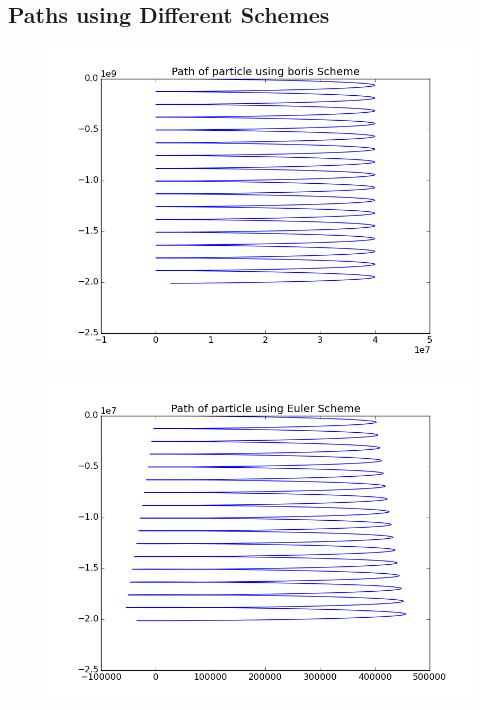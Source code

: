\documentclass[11pt, a4paper]{article}
\begin{document}
\subsection{Paths using Different Schemes}
\begin{figure}[H]
 \centering
 \includegraphics[width = \textwidth]{q3_boris.png}
\end{figure}
\begin{figure}[H]
 \centering
 \includegraphics[width = \textwidth]{q3_euler.png}
\end{figure}
\end{document}
